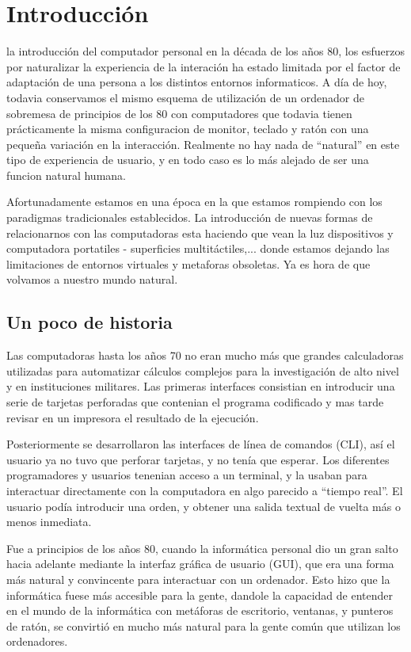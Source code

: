 \chapter{Introducción}

 la introducción del computador personal en la década de los años 80, los esfuerzos por naturalizar la experiencia de la interación ha estado limitada por el factor de adaptación de una persona a los distintos entornos informaticos. A día de hoy, todavia conservamos el mismo esquema de utilización de un ordenador de sobremesa de principios de los 80 con computadores que todavia tienen prácticamente la misma configuracion de monitor, teclado y ratón con una pequeña variación en la interacción. Realmente no hay nada de ``natural'' en este tipo de experiencia de usuario, y en todo caso es lo más alejado de ser una funcion natural humana.

Afortunadamente estamos en una época en la que estamos rompiendo con los paradigmas tradicionales establecidos. La introducción de nuevas formas de relacionarnos con las computadoras esta haciendo que vean la luz dispositivos y computadora portatiles - superficies multitáctiles,... donde estamos dejando las limitaciones de entornos virtuales y metaforas obsoletas. Ya es hora de que volvamos a nuestro mundo natural.

\section{Un poco de historia}
Las computadoras hasta los años 70 no eran mucho más que grandes calculadoras utilizadas para automatizar cálculos complejos para la investigación de alto nivel y en instituciones militares. Las primeras interfaces consistian en introducir una serie de tarjetas perforadas que contenian el programa codificado y mas tarde revisar en un impresora el resultado de la ejecución.

Posteriormente se desarrollaron las interfaces de línea de comandos (CLI), así el usuario ya no tuvo que perforar tarjetas, y no tenía que esperar. Los diferentes programadores y usuarios tenenian acceso a un terminal, y la usaban para interactuar directamente con la computadora en algo parecido a ``tiempo real''. El usuario podía introducir una orden, y obtener una salida textual de vuelta más o menos inmediata.

Fue a principios de los años 80, cuando la informática personal dio un gran salto hacia adelante mediante la interfaz gráfica de usuario (GUI), que era una forma más natural y convincente para interactuar con un ordenador. Esto hizo que la informática fuese más accesible para la gente, dandole la capacidad de entender en el mundo de la informática con metáforas de escritorio, ventanas, y punteros de ratón, se convirtió en mucho más natural para la gente común que utilizan los ordenadores.

